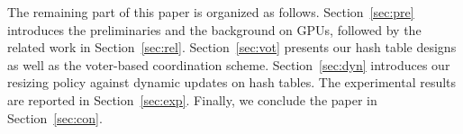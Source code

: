 The remaining part of this paper is organized as follows. Section~\ref{sec:pre} introduces the preliminaries and the background on GPUs, followed by the related work in Section~\ref{sec:rel}. Section~\ref{sec:vot} presents our hash table designs as well as the voter-based coordination scheme.  Section~\ref{sec:dyn} introduces our resizing policy against dynamic updates on hash tables. The experimental results are reported in Section~\ref{sec:exp}. Finally, we conclude the paper in Section~\ref{sec:con}. 